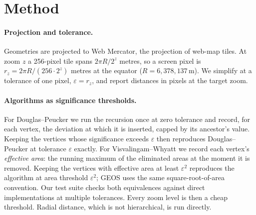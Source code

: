 \documentclass[11pt]{article}
\begin{document}
\section{Method}
\label{sec:method}

\paragraph{Projection and tolerance.}
Geometries are projected to Web Mercator, the projection of web-map tiles. At
zoom $z$ a 256-pixel tile spans $2\pi R/2^z$ metres, so a screen pixel is
$r_z = 2\pi R/(256\cdot 2^z)$ metres at the equator ($R=6{,}378{,}137$\,m). We
simplify at a tolerance of one pixel, $\varepsilon = r_z$, and report distances
in pixels at the target zoom.

\paragraph{Algorithms as significance thresholds.}
For Douglas--Peucker we run the recursion once at zero tolerance and record,
for each vertex, the deviation at which it is inserted, capped by its
ancestor's value. Keeping the vertices whose significance exceeds
$\varepsilon$ then reproduces Douglas--Peucker at tolerance $\varepsilon$
exactly. For Visvalingam--Whyatt we record each vertex's \emph{effective area}:
the running maximum of the eliminated areas at the moment it is removed.
Keeping the vertices with effective area at least $\varepsilon^2$ reproduces
the algorithm at area threshold $\varepsilon^2$; GEOS uses the same
square-root-of-area convention. Our test suite checks both equivalences against
direct implementations at multiple tolerances. Every zoom level is then a cheap
threshold. Radial distance, which is not hierarchical, is run directly.
\end{document}
